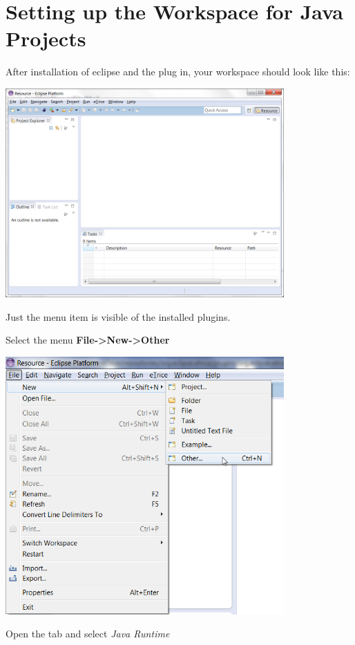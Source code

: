 \section{Setting up the Workspace for Java Projects}

After installation of eclipse and the \eTrice{} plug in, your workspace should look like this:  

\includegraphics[width=0.8\textwidth]{images/013-SetupWorkspace01.png}

Just the \textit{\eTrice{}} menu item is visible of the installed \eTrice{} plugins.

Select the menu \textbf{File->New->Other}

\includegraphics[width=0.8\textwidth]{images/013-SetupWorkspace02.png}

Open the \textit{\eTrice{}} tab and select \textit{\eTrice{} Java Runtime}

